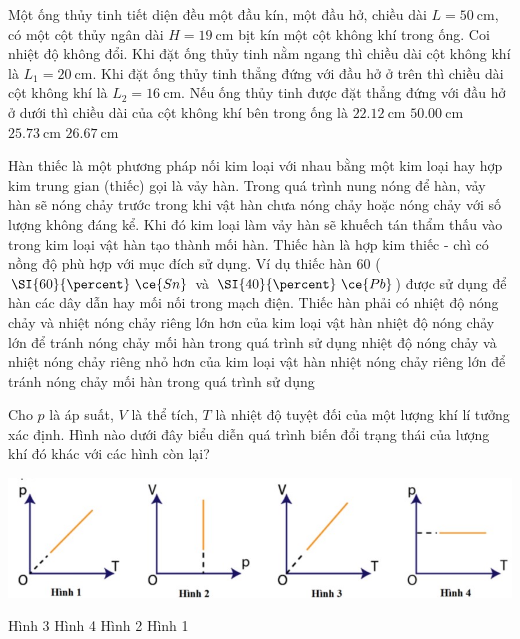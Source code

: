 \begin{ex}
	Một ống thủy tinh tiết diện đều một đầu kín, một đầu hở, chiều dài $L=\SI{50}{\centi\meter}$, có một cột thủy ngân dài $H =\SI{19}{\centi\meter}$ bịt kín một cột không khí trong ống. Coi nhiệt độ không đổi. Khi đặt ống thủy tinh nằm ngang thì chiều dài cột không khí là $L_1=\SI{20}{\centi\meter}$. Khi đặt ống thủy tinh thẳng đứng với đầu hở ở trên thì chiều dài cột không khí là $L_2=\SI{16}{\centi\meter}$. Nếu ống thủy tinh được đặt thẳng đứng với đầu hở ở dưới thì chiều dài của cột không khí bên trong ống là
	\choice
	{$\SI{22.12}{\centi\meter}$}
	{$\SI{50.00}{\centi\meter}$}
	{$\SI{25.73}{\centi\meter}$}
	{$\SI{26.67}{\centi\meter}$}
\end{ex}
\begin{ex}
	Hàn thiếc là một phương pháp nối kim loại với nhau bằng một kim loại hay hợp kim trung gian (thiếc) gọi là vảy hàn. Trong quá trình nung nóng để hàn, vảy hàn sẽ nóng chảy trước trong khi vật hàn chưa nóng chảy hoặc nóng chảy với số lượng không đáng kể. Khi đó kim loại làm vảy hàn sẽ khuếch tán thẩm thấu vào trong kim loại vật hàn tạo thành mối hàn. Thiếc hàn là hợp kim	thiếc - chì có nồng độ phù hợp với mục đích sử dụng. Ví dụ thiếc hàn 60 ($\SI{60}{\percent}\ \ce{Sn}$ và $\SI{40}{\percent}
	\ \ce{Pb}$) được sử dụng để hàn các dây dẫn hay mối nối trong mạch điện. Thiếc hàn phải có
	\choice
	{nhiệt độ nóng chảy và nhiệt nóng chảy riêng lớn hơn của kim loại vật hàn}
	{nhiệt độ nóng chảy lớn để tránh nóng chảy mối hàn trong quá trình sử dụng}
	{\True nhiệt độ nóng chảy và nhiệt nóng chảy riêng nhỏ hơn của kim loại vật hàn}
	{nhiệt nóng chảy riêng lớn để tránh nóng chảy mối hàn trong quá trình sử dụng}
\end{ex}
\begin{ex}
	Cho $p$ là áp suất, $V$ là thể tích, $T$ là nhiệt độ tuyệt đối của một lượng khí lí tưởng xác định. Hình nào dưới đây biểu diễn quá trình biến đổi trạng thái của lượng khí đó khác với các hình còn lại?
	\begin{center}
		\includegraphics[width=0.7\linewidth]{../figs/D12-2-4}
	\end{center}
	\choice
	{Hình 3}
	{Hình 4}
	{Hình 2}
	{\True Hình 1}
\end{ex}
